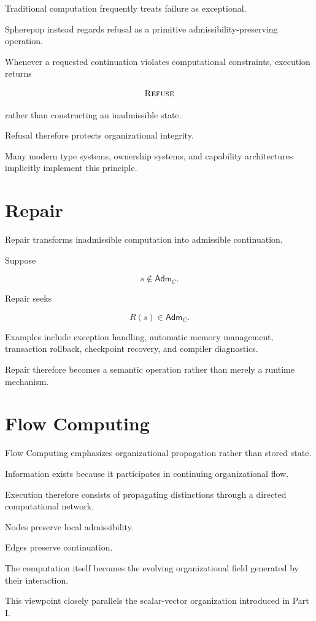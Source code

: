 \documentclass[11pt,oneside]{book}
\numberwithin{equation}{chapter}
\theoremstyle{definition}
\theoremstyle{plain}
\newcommand{\Adm}{\mathsf{Adm}}
\begin{document}
Traditional computation frequently treats failure as exceptional.

Spherepop instead regards refusal as a primitive admissibility-preserving
operation.

Whenever a requested continuation violates computational constraints,
execution returns

\[
\textsc{Refuse}
\]

rather than constructing an inadmissible state.

Refusal therefore protects organizational integrity.

Many modern type systems, ownership systems, and capability architectures
implicitly implement this principle.

\section{Repair}

Repair transforms inadmissible computation into admissible continuation.

Suppose

\[
s
\notin
\Adm_C.
\]

Repair seeks

\[
R(s)
\in
\Adm_C.
\]

Examples include exception handling, automatic memory management,
transaction rollback, checkpoint recovery, and compiler diagnostics.

Repair therefore becomes a semantic operation rather than merely a
runtime mechanism.

\section{Flow Computing}

Flow Computing emphasizes organizational propagation rather than stored
state.

Information exists because it participates in continuing organizational
flow.

Execution therefore consists of propagating distinctions through a
directed computational network.

Nodes preserve local admissibility.

Edges preserve continuation.

The computation itself becomes the evolving organizational field
generated by their interaction.

This viewpoint closely parallels the scalar-vector organization
introduced in Part I.
\end{document}
